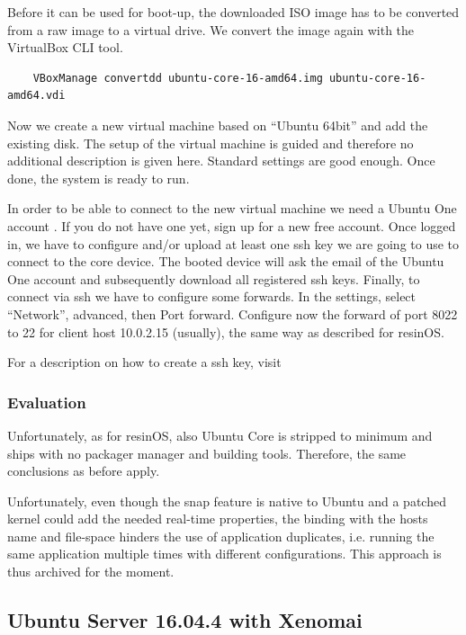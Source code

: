 \documentclass[]{scrartcl}
\begin{document}
Before it can be used for boot-up, the downloaded ISO image has to be converted from a raw image to a virtual drive. We convert the image again with the VirtualBox CLI tool.

\begin{verbatim}
	VBoxManage convertdd ubuntu-core-16-amd64.img ubuntu-core-16-amd64.vdi
\end{verbatim}

Now we create a new virtual machine based on ``Ubuntu 64bit'' and add the existing disk. The setup of the virtual machine is guided and therefore no additional description is given here. Standard settings are good enough. Once done, the system is ready to run.

In order to be able to connect to the new virtual machine we need a Ubuntu One account \cite{ubuntu03}. 
If you do not have one yet, sign up for a new free account. Once logged in, we have to configure and/or upload at least one ssh key we are going to use to connect to the core device. The booted device will ask the email of the Ubuntu One account and subsequently download all registered ssh keys. 
Finally, to connect via ssh we have to configure some forwards. In the settings, select ``Network'', advanced, then Port forward.
Configure now the forward of port 8022 to 22 for client host 10.0.2.15 (usually), the same way as described for resinOS.

For a description on how to create a ssh key, visit \cite{atlassian01}

\subsubsection{Evaluation}

Unfortunately, as for resinOS, also Ubuntu Core is stripped to minimum and ships with no packager manager and building tools. Therefore, the same conclusions as before apply.

Unfortunately, even though the snap feature is native to Ubuntu and a patched kernel could add the needed real-time properties, the binding with the hosts name and file-space hinders the use of application duplicates, i.e. running the same application multiple times with different configurations. This approach is thus archived for the moment.

\subsection{Ubuntu Server 16.04.4 with Xenomai}
\end{document}
